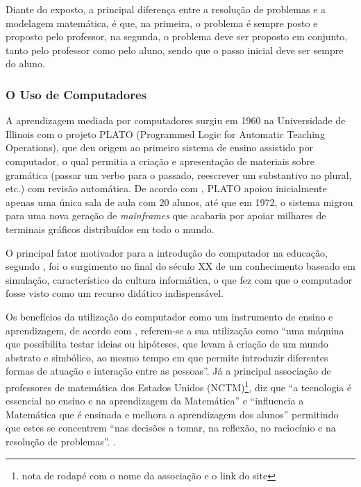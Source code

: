 Diante do exposto, a principal diferença entre a resolução de problemas e a modelagem matemática, é que, na primeira, o problema é sempre posto e proposto pelo professor, na segunda, o problema deve ser proposto em conjunto, tanto pelo professor como pelo aluno, sendo que o passo inicial deve ser sempre do aluno.

\subsubsection{O Uso de Computadores}

A aprendizagem mediada por computadores surgiu em 1960 na Universidade de Illinois com o projeto PLATO (Programmed Logic for Automatic Teaching Operations)\cite{bitzer1961plato}, que deu origem ao 
primeiro sistema de ensino assistido por computador, o qual permitia a criação e apresentação de materiais sobre gram\'atica (passar um verbo para o passado, reescrever um substantivo no plural, 
etc.) com revisão automática. De acordo com , PLATO apoiou inicialmente apenas uma única sala de aula com 20 alunos, até que em 1972, o sistema migrou para uma nova 
geração de \textit{mainframes} que acabaria por apoiar milhares de terminais gráficos distribuídos em todo o mundo.

O principal fator motivador para a introdução do computador na educação, segundo , foi o surgimento no final do século XX de um conhecimento baseado em simulação, 
característico da cultura informática, o que fez com que o computador fosse visto como  um recurso didático  indispensável.

Os benefícios da utilização do computador como um instrumento de ensino e aprendizagem, de acordo com , referem-se a sua utilização como ``uma máquina que 
possibilita testar ideias ou hipóteses, que levam à criação de um mundo abstrato e simbólico, ao mesmo tempo em que permite introduzir diferentes formas de atuação e interação entre as pessoas''. Já a 
principal associação de professores de matemática dos Estados Unidos (NCTM)\footnote{nota de rodap\'e com o nome da associa\c{c}\~ao e o link do site}, diz que ``a tecnologia é essencial no ensino e 
na aprendizagem da Matemática'' e ``influencia a Matemática que é ensinada e melhora a aprendizagem dos alunos'' permitindo que estes se concentrem ``nas decisões a tomar, na reflexão, no raciocínio e 
na resolução de problemas''. \cite[p.26]{melo2007principios}.

